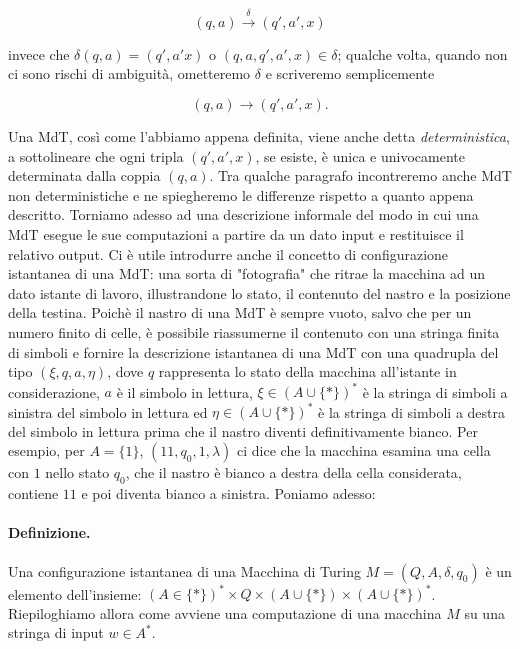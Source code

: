 \[
    (q, a) \xrightarrow{ \ \delta \ }  (q', a', x)
\]

invece che $\delta (q, a) = (q', a' x)$ o $(q, a, q', a', x) \in \delta$;
qualche volta, quando non ci
sono rischi di ambiguità, ometteremo $\delta$ e scriveremo semplicemente

\[
    (q, a) \rightarrow (q', a', x).
\]

Una MdT, così come l'abbiamo appena definita, viene anche detta \textit{deterministica},
a sottolineare che ogni tripla $(q', a', x)$, se esiste, è unica e univocamente
determinata dalla coppia $(q, a)$.
Tra qualche paragrafo incontreremo anche MdT non
deterministiche e ne spiegheremo le differenze rispetto a quanto appena descritto.
Torniamo adesso ad una descrizione informale del modo in cui una MdT esegue le
sue computazioni a partire da un dato input e restituisce il relativo output.
Ci è utile introdurre anche il concetto di configurazione istantanea di una MdT:
una sorta
di "fotografia" che ritrae la macchina ad un dato istante di lavoro,
illustrandone lo
stato, il contenuto del nastro e la posizione della testina.
Poichè il nastro di una MdT è sempre vuoto, salvo che per un numero finito di celle,
è possibile riassumerne il contenuto con una stringa finita di simboli e fornire
la descrizione istantanea di una MdT con una quadrupla del tipo $(\xi, q, a, \eta)$,
dove $q$ rappresenta lo stato della macchina all'istante in considerazione,
$a$ è il simbolo in lettura, $\xi \in (A \cup \{*\})^*$ è la stringa di simboli a
sinistra del simbolo in lettura ed
$\eta \in (A \cup \{*\})^*$ è la stringa di simboli a destra del simbolo in lettura
prima che il nastro diventi definitivamente bianco. Per esempio,
per $A = \{1\}$, $(11, q_0 , 1, \lambda)$ ci
dice che la macchina esamina una cella con $1$ nello stato $q_0$, che il nastro è
bianco
a destra della cella considerata, contiene $11$ e poi diventa bianco a sinistra.
Poniamo adesso:

\paragraph{Definizione.}
Una configurazione istantanea di una Macchina di Turing
$M =(Q, A, \delta, q_0)$ è un elemento dell'insieme:
$(A \in \{*\})^* \times Q \times (A \cup \{*\}) \times (A \cup \{*\})^*$.\\

Riepiloghiamo allora come avviene una computazione di una macchina $M$ su una
stringa di input $w \in A^*$.

